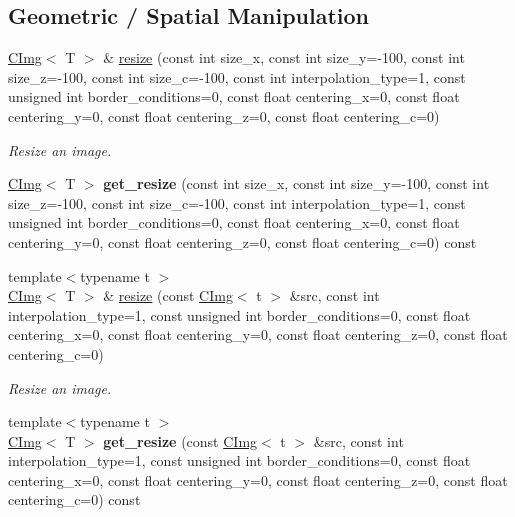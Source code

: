 \subsection*{Geometric / Spatial Manipulation}
\label{_amgrp4e29bdaaccbe98a135854877faf24394}
 \begin{DoxyCompactItemize}
\item 
\hyperlink{structcimg__library_1_1CImg}{CImg}$<$ T $>$ \& \hyperlink{structcimg__library_1_1CImg_a2fa6df9e3b47fc86c59851cadaf6e3e6}{resize} (const int size\_\-x, const int size\_\-y=-\/100, const int size\_\-z=-\/100, const int size\_\-c=-\/100, const int interpolation\_\-type=1, const unsigned int border\_\-conditions=0, const float centering\_\-x=0, const float centering\_\-y=0, const float centering\_\-z=0, const float centering\_\-c=0)
\begin{DoxyCompactList}\small\item\em Resize an image. \item\end{DoxyCompactList}\item 
\hypertarget{structcimg__library_1_1CImg_a92474609e5d717ef90139ba15491a4f2}{
\hyperlink{structcimg__library_1_1CImg}{CImg}$<$ T $>$ {\bfseries get\_\-resize} (const int size\_\-x, const int size\_\-y=-\/100, const int size\_\-z=-\/100, const int size\_\-c=-\/100, const int interpolation\_\-type=1, const unsigned int border\_\-conditions=0, const float centering\_\-x=0, const float centering\_\-y=0, const float centering\_\-z=0, const float centering\_\-c=0) const }
\label{structcimg__library_1_1CImg_a92474609e5d717ef90139ba15491a4f2}

\item 
\hypertarget{structcimg__library_1_1CImg_a3a18787a17cfdd63fbfeffb6804c8b77}{
{\footnotesize template$<$typename t $>$ }\\\hyperlink{structcimg__library_1_1CImg}{CImg}$<$ T $>$ \& \hyperlink{structcimg__library_1_1CImg_a3a18787a17cfdd63fbfeffb6804c8b77}{resize} (const \hyperlink{structcimg__library_1_1CImg}{CImg}$<$ t $>$ \&src, const int interpolation\_\-type=1, const unsigned int border\_\-conditions=0, const float centering\_\-x=0, const float centering\_\-y=0, const float centering\_\-z=0, const float centering\_\-c=0)}
\label{structcimg__library_1_1CImg_a3a18787a17cfdd63fbfeffb6804c8b77}

\begin{DoxyCompactList}\small\item\em Resize an image. \item\end{DoxyCompactList}\item 
\hypertarget{structcimg__library_1_1CImg_a94ae87c01f5006827fdf422b6e013121}{
{\footnotesize template$<$typename t $>$ }\\\hyperlink{structcimg__library_1_1CImg}{CImg}$<$ T $>$ {\bfseries get\_\-resize} (const \hyperlink{structcimg__library_1_1CImg}{CImg}$<$ t $>$ \&src, const int interpolation\_\-type=1, const unsigned int border\_\-conditions=0, const float centering\_\-x=0, const float centering\_\-y=0, const float centering\_\-z=0, const float centering\_\-c=0) const }
\label{structcimg__library_1_1CImg_a94ae87c01f5006827fdf422b6e013121}


\end{DoxyCompactItemize}
